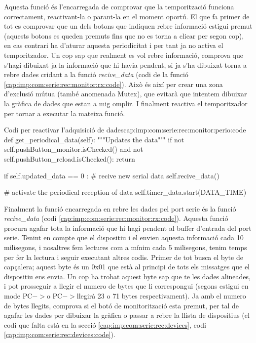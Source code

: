 Aquesta funció és l'encarregada de comprovar que la temporització funciona correctament, reactivant-la o parant-la en el moment oportú. El que fa primer de tot es comprovar que un dels botons que indiquen rebre informació estigui premut (aquests botons es queden premuts fins que no es torna a clicar per segon cop), en cas contrari ha d'aturar aquesta periodicitat i per tant ja no activa el temporitzador.
Un cop sap que realment es vol rebre informació, comprova que s'hagi dibuixat ja la informació que hi havia pendent, si ja s'ha dibuixat torna a rebre dades cridant a la funció \emph{recive\_data} (codi de la funció \ref{cap:imp:com:serie:rec:monitor:rx:code}). Això és així per crear una zona d'exclusió mútua (també anomenada Mutex), que evitarà que intentem dibuixar la gràfica de dades que estan a mig omplir.
I finalment reactiva el temporitzador per tornar a executar la mateixa funció.

\begin{code_python}{Codi per reactivar l'adquisició de dades}{cap:imp:com:serie:rec:monitor:perio:code}
def get_periodical_data(self):
    """Updates the data"""
    if not self.pushButton_monitor.isChecked() and not self.pushButton_reload.isChecked():
        return
    
    if self.updated_data == 0 :
        # recive new serial data
        self.recive_data()
        
    # activate the periodical reception of data
    self.timer_data.start(DATA_TIME)
\end{code_python}

Finalment la funció encarregada en rebre les dades pel port serie és la funció \emph{recive\_data} (codi \ref{cap:imp:com:serie:rec:monitor:rx:code}). Aquesta funció procura agafar tota la informació que hi hagi pendent al buffer d'entrada del port serie. Tenint en compte que el dispositiu \Monitor i el \SensorActuador envien aquesta informació cada 10 milisegons, i nosaltres fem lectures com a mínim cada 5 milisegons, tenim temps per fer la lectura i seguir executant altres codis. Primer de tot busca el byte de capçalera; aquest byte és un 0x01 que està al principi de tots els missatges que el dispositiu ens envia. Un cop ha trobat aquest byte sap que te les dades alineades, i pot prosseguir a llegir el numero de bytes que li correspongui (segons estigui en mode PC$->$\SensorActuador o PC$->$\Monitor llegirà 23 o 71 bytes respectivament). Ja amb el numero de bytes llegits, comprova si el botó de monitorització esta premut, per tal de agafar les dades per dibuixar la gràfica o passar a rebre la llista de dispositius (el codi que falta està en la secció \ref{cap:imp:com:serie:rec:devices}, codi \ref{cap:imp:com:serie:rec:devices:code}).

